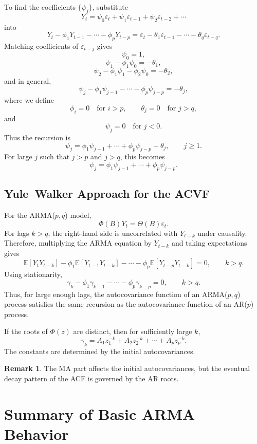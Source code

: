\documentclass[12pt,oneside]{book}
\numberwithin{equation}{section}
\theoremstyle{definition}
\newtheorem{remark}{Remark}[section]
\theoremstyle{plain}
\theoremstyle{remark}
\newcommand{\E}{\mathbb{E}}
\begin{document}
To find the coefficients $\{\psi_j\}$, substitute
\[
Y_t=\psi_0\varepsilon_t+\psi_1\varepsilon_{t-1}+\psi_2\varepsilon_{t-2}+\cdots
\]
into
\[
Y_t-\phi_1Y_{t-1}-\cdots-\phi_pY_{t-p}
=
\varepsilon_t-\theta_1\varepsilon_{t-1}-\cdots-\theta_q\varepsilon_{t-q}.
\]
Matching coefficients of $\varepsilon_{t-j}$ gives
\[
\psi_0=1,
\]
\[
\psi_1-\phi_1\psi_0=-\theta_1,
\]
\[
\psi_2-\phi_1\psi_1-\phi_2\psi_0=-\theta_2,
\]
and in general,
\[
\psi_j-\phi_1\psi_{j-1}-\cdots-\phi_p\psi_{j-p}=-\theta_j,
\]
where we define
\[
\phi_i=0 \quad \text{for } i>p,
\qquad
\theta_j=0 \quad \text{for } j>q,
\]
and
\[
\psi_j=0 \quad \text{for } j<0.
\]
Thus the recursion is
\[
\psi_j
=
\phi_1\psi_{j-1}
+\cdots+
\phi_p\psi_{j-p}
-\theta_j,
\qquad j\geq 1.
\]
For large $j$ such that $j>p$ and $j>q$, this becomes
\[
\psi_j
=
\phi_1\psi_{j-1}
+\cdots+
\phi_p\psi_{j-p}.
\]

\subsection{Yule--Walker Approach for the ACVF}

For the ARMA($p,q$) model,
\[
\Phi(B)Y_t=\Theta(B)\varepsilon_t.
\]
For lags $k>q$, the right-hand side is uncorrelated with $Y_{t-k}$ under causality. Therefore, multiplying the ARMA equation by $Y_{t-k}$ and taking expectations gives
\[
\E[Y_tY_{t-k}]
-\phi_1\E[Y_{t-1}Y_{t-k}]
-\cdots
-\phi_p\E[Y_{t-p}Y_{t-k}]
=0,
\qquad k>q.
\]
Using stationarity,
\[
\gamma_k-\phi_1\gamma_{k-1}-\cdots-\phi_p\gamma_{k-p}=0,
\qquad k>q.
\]
Thus, for large enough lags, the autocovariance function of an ARMA($p,q$) process satisfies the same recursion as the autocovariance function of an AR($p$) process.

If the roots of $\Phi(z)$ are distinct, then for sufficiently large $k$,
\[
\gamma_k
=
A_1z_1^{-k}+A_2z_2^{-k}+\cdots+A_pz_p^{-k}.
\]
The constants are determined by the initial autocovariances.

\begin{remark}
The MA part affects the initial autocovariances, but the eventual decay pattern of the ACF is governed by the AR roots.
\end{remark}

\section{Summary of Basic ARMA Behavior}
\end{document}

